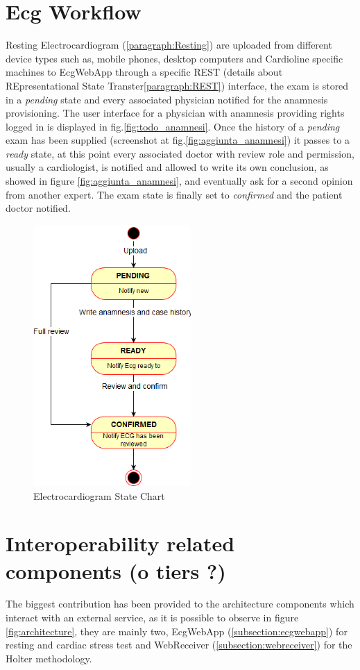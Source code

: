 \section{Ecg Workflow}
Resting Electrocardiogram (\ref{paragraph:Resting}) are uploaded from different device types such as, mobile phones, desktop computers and Cardioline specific machines to EcgWebApp through a specific REST (details about REpresentational State Transter\ref{paragraph:REST}) interface, the exam is stored in a \textit{pending} state and every associated physician notified for the anamnesis provisioning.
The user interface for a physician with anamnesis providing rights logged in is displayed in fig.\ref{fig:todo_anamnesi}.
Once the history of a \textit{pending} exam has been supplied (screenshot at fig.\ref{fig:aggiunta_anamnesi}) it passes to a \textit{ready} state, at this point every associated doctor with review role and permission, usually a cardiologist, is notified and allowed to write its own conclusion, as showed in figure \ref{fig:aggiunta_anamnesi}, and eventually ask for a second opinion from another expert. The exam state is finally set to \textit{confirmed} and the patient doctor notified.
\begin{figure}[h]
    \centering
    \includegraphics[width=6cm]{img/ECGstatechart}
    \caption{Electrocardiogram State Chart}
    \label{fig:ECGstatechart}
\end{figure}
\clearpage

\section{Interoperability related components (o tiers ?)}
The biggest contribution has been provided to the architecture components which interact with an external service, as it is possible to observe in figure \ref{fig:architecture}, they are mainly two, EcgWebApp (\ref{subsection:ecgwebapp}) for resting and cardiac stress test and WebReceiver (\ref{subsection:webreceiver}) for the Holter methodology.
